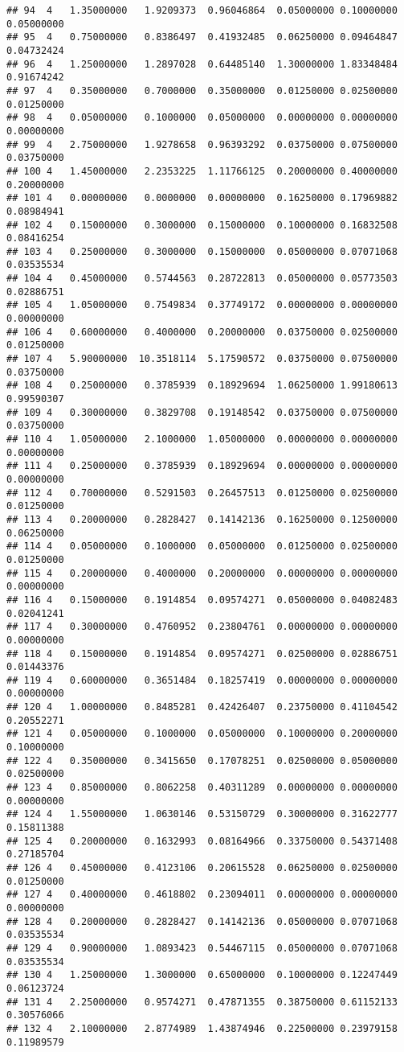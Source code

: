 \documentclass[
]{article}
\begin{document}
\begin{verbatim}
## 94  4   1.35000000   1.9209373  0.96046864  0.05000000 0.10000000 0.05000000
## 95  4   0.75000000   0.8386497  0.41932485  0.06250000 0.09464847 0.04732424
## 96  4   1.25000000   1.2897028  0.64485140  1.30000000 1.83348484 0.91674242
## 97  4   0.35000000   0.7000000  0.35000000  0.01250000 0.02500000 0.01250000
## 98  4   0.05000000   0.1000000  0.05000000  0.00000000 0.00000000 0.00000000
## 99  4   2.75000000   1.9278658  0.96393292  0.03750000 0.07500000 0.03750000
## 100 4   1.45000000   2.2353225  1.11766125  0.20000000 0.40000000 0.20000000
## 101 4   0.00000000   0.0000000  0.00000000  0.16250000 0.17969882 0.08984941
## 102 4   0.15000000   0.3000000  0.15000000  0.10000000 0.16832508 0.08416254
## 103 4   0.25000000   0.3000000  0.15000000  0.05000000 0.07071068 0.03535534
## 104 4   0.45000000   0.5744563  0.28722813  0.05000000 0.05773503 0.02886751
## 105 4   1.05000000   0.7549834  0.37749172  0.00000000 0.00000000 0.00000000
## 106 4   0.60000000   0.4000000  0.20000000  0.03750000 0.02500000 0.01250000
## 107 4   5.90000000  10.3518114  5.17590572  0.03750000 0.07500000 0.03750000
## 108 4   0.25000000   0.3785939  0.18929694  1.06250000 1.99180613 0.99590307
## 109 4   0.30000000   0.3829708  0.19148542  0.03750000 0.07500000 0.03750000
## 110 4   1.05000000   2.1000000  1.05000000  0.00000000 0.00000000 0.00000000
## 111 4   0.25000000   0.3785939  0.18929694  0.00000000 0.00000000 0.00000000
## 112 4   0.70000000   0.5291503  0.26457513  0.01250000 0.02500000 0.01250000
## 113 4   0.20000000   0.2828427  0.14142136  0.16250000 0.12500000 0.06250000
## 114 4   0.05000000   0.1000000  0.05000000  0.01250000 0.02500000 0.01250000
## 115 4   0.20000000   0.4000000  0.20000000  0.00000000 0.00000000 0.00000000
## 116 4   0.15000000   0.1914854  0.09574271  0.05000000 0.04082483 0.02041241
## 117 4   0.30000000   0.4760952  0.23804761  0.00000000 0.00000000 0.00000000
## 118 4   0.15000000   0.1914854  0.09574271  0.02500000 0.02886751 0.01443376
## 119 4   0.60000000   0.3651484  0.18257419  0.00000000 0.00000000 0.00000000
## 120 4   1.00000000   0.8485281  0.42426407  0.23750000 0.41104542 0.20552271
## 121 4   0.05000000   0.1000000  0.05000000  0.10000000 0.20000000 0.10000000
## 122 4   0.35000000   0.3415650  0.17078251  0.02500000 0.05000000 0.02500000
## 123 4   0.85000000   0.8062258  0.40311289  0.00000000 0.00000000 0.00000000
## 124 4   1.55000000   1.0630146  0.53150729  0.30000000 0.31622777 0.15811388
## 125 4   0.20000000   0.1632993  0.08164966  0.33750000 0.54371408 0.27185704
## 126 4   0.45000000   0.4123106  0.20615528  0.06250000 0.02500000 0.01250000
## 127 4   0.40000000   0.4618802  0.23094011  0.00000000 0.00000000 0.00000000
## 128 4   0.20000000   0.2828427  0.14142136  0.05000000 0.07071068 0.03535534
## 129 4   0.90000000   1.0893423  0.54467115  0.05000000 0.07071068 0.03535534
## 130 4   1.25000000   1.3000000  0.65000000  0.10000000 0.12247449 0.06123724
## 131 4   2.25000000   0.9574271  0.47871355  0.38750000 0.61152133 0.30576066
## 132 4   2.10000000   2.8774989  1.43874946  0.22500000 0.23979158 0.11989579
\end{verbatim}
\end{document}
